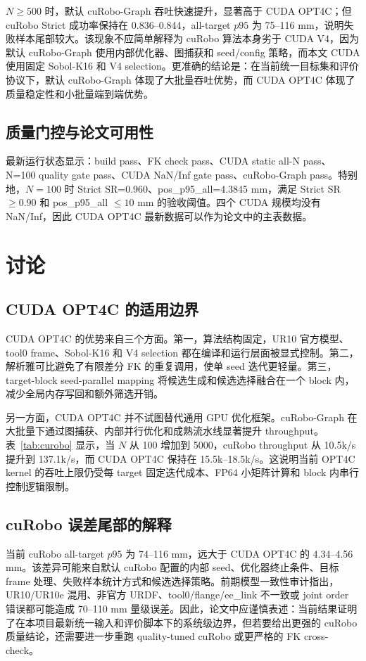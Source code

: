 \documentclass[twocolumn,a4paper,10pt]{ctexart}
\begin{document}
$N\ge500$ 时，默认 cuRobo-Graph 吞吐快速提升，显著高于 CUDA OPT4C；但 cuRobo Strict 成功率保持在 0.836--0.844，all-target $p95$ 为 75--116 mm，说明失败样本尾部较大。该现象不应简单解释为 cuRobo 算法本身劣于 CUDA V4，因为默认 cuRobo-Graph 使用内部优化器、图捕获和 seed/config 策略，而本文 CUDA 使用固定 Sobol-K16 和 V4 selection。更准确的结论是：在当前统一目标集和评价协议下，默认 cuRobo-Graph 体现了大批量吞吐优势，而 CUDA OPT4C 体现了质量稳定性和小批量端到端优势。

\subsection{质量门控与论文可用性}

最新运行状态显示：build pass、FK check pass、CUDA static all-N pass、N=100 quality gate pass、CUDA NaN/Inf gate pass、cuRobo-Graph pass。特别地，$N=100$ 时 Strict SR=0.960、pos\_p95\_all=4.3845 mm，满足 Strict SR $\ge0.90$ 和 pos\_p95\_all $\le10$ mm 的验收阈值。四个 CUDA 规模均没有 NaN/Inf，因此 CUDA OPT4C 最新数据可以作为论文中的主表数据。

\section{讨论}

\subsection{CUDA OPT4C 的适用边界}

CUDA OPT4C 的优势来自三个方面。第一，算法结构固定，UR10 官方模型、tool0 frame、Sobol-K16 和 V4 selection 都在编译和运行层面被显式控制。第二，解析雅可比避免了有限差分 FK 的重复调用，使单 seed 迭代更轻量。第三，target-block seed-parallel mapping 将候选生成和候选选择融合在一个 block 内，减少全局内存写回和额外筛选开销。

另一方面，CUDA OPT4C 并不试图替代通用 GPU 优化框架。cuRobo-Graph 在大批量下通过图捕获、内部并行优化和成熟流水线显著提升 throughput。表~\ref{tab:curobo} 显示，当 $N$ 从 100 增加到 5000，cuRobo throughput 从 10.5k/s 提升到 137.1k/s，而 CUDA OPT4C 保持在 15.5k--18.5k/s。这说明当前 OPT4C kernel 的吞吐上限仍受每 target 固定迭代成本、FP64 小矩阵计算和 block 内串行控制逻辑限制。

\subsection{cuRobo 误差尾部的解释}

当前 cuRobo all-target $p95$ 为 74--116 mm，远大于 CUDA OPT4C 的 4.34--4.56 mm。该差异可能来自默认 cuRobo 配置的内部 seed、优化器终止条件、目标 frame 处理、失败样本统计方式和候选选择策略。前期模型一致性审计指出，UR10/UR10e 混用、非官方 URDF、tool0/flange/ee\_link 不一致或 joint order 错误都可能造成 70--110 mm 量级误差。因此，论文中应谨慎表述：当前结果证明了在本项目最新统一输入和评价脚本下的系统级边界，但若要给出更强的 cuRobo 质量结论，还需要进一步重跑 quality-tuned cuRobo 或更严格的 FK cross-check。
\end{document}
